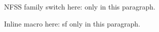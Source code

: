 NFSS family switch here: \sffamily only in this paragraph.

Inline macro here: \textsf{sf} only in this paragraph.

